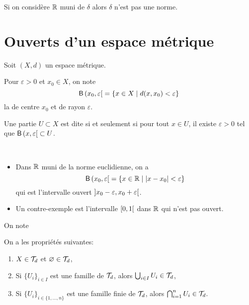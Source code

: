 \begin{remark}
    Si on considère \(\mathbb{R}\) muni de \(\delta\) alors \(\delta\) n'est pas une norme.
\end{remark}

\section{Ouverts d'un espace métrique}\label{sec:ouverts-dun-espace-metrique}

Soit \((X, d)\) un espace métrique.

\begin{definition}
    Pour \(\varepsilon > 0\) et \(x_0\in X\), on note
    \begin{equation*}
        \mathsf{B}\left({x_0, \varepsilon}\mathopen{}\right[\mathclose{} = \{x \in X \mid d(x, x_0) < \varepsilon\}
    \end{equation*}
    la  de centre \(x_0\) et de rayon \(\varepsilon\).
\end{definition}

\begin{definition}
    Une partie \(U \subset X\) est dite  si et seulement si
    pour tout \(x \in U\), il existe \(\varepsilon > 0\) tel que \(\mathsf{B}\left({x, \varepsilon}\mathopen{}\right[\mathclose{} \subset U\).
\end{definition}

\begin{example}\,
    \begin{itemize}
        \item Dans \(\mathbb{R}\) muni de la norme euclidienne, on a
        \begin{equation*}
            \mathsf{B}\left({x_0, \varepsilon}\mathopen{}\right[\mathclose{} = \{ x \in \mathbb{R} \mid \left\lvert x - x_0\right\rvert < \varepsilon \}
        \end{equation*}
        qui est l'intervalle ouvert \(\mathopen{}\left]x_0 - \varepsilon, x_0 + \varepsilon\right[\mathclose{}\).

        \item Un contre-exemple est l'intervalle \(\mathopen{}\left[0, 1\right[\mathclose{}\) dans \(\mathbb{R}\) qui n'est pas ouvert.
    \end{itemize}
\end{example}

\begin{definition}
    On note 
\end{definition}

\begin{proposition}
    On a les propriétés suivantes:
    \begin{enumerate}[label=(\roman*)] %
        \item \(X \in \mathcal{T}_d\) et \(\varnothing \in \mathcal{T}_d\),
        \item Si \({\{U_i\}}_{i \in I}\) est une famille de \(\mathcal{T}_d\), alors \(\bigcup_{i \in I} U_i \in \mathcal{T}_d\),
        \item Si  \({\{U_i\}}_{i \in \{1, \ldots, n\}}\) est une famille finie de \(\mathcal{T}_d\), alors \(\bigcap_{i = 1}^n U_i \in \mathcal{T}_d\).
    \end{enumerate}
\end{proposition}

